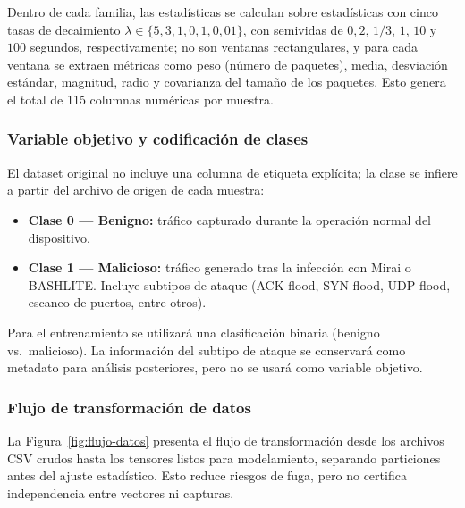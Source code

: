 \documentclass[11pt,a4paper]{article}
\begin{document}
Dentro de cada familia, las estadísticas se calculan sobre estadísticas con cinco tasas de decaimiento $\lambda \in \{5,3,1,0{,}1,0{,}01\}$, con semividas de $0{,}2$, $1/3$, $1$, $10$ y $100$ segundos, respectivamente; no son ventanas rectangulares, y para cada ventana se extraen métricas como peso (número de paquetes), media, desviación estándar, magnitud, radio y covarianza del tamaño de los paquetes. Esto genera el total de 115 columnas numéricas por muestra.

\subsubsection{Variable objetivo y codificación de clases}
El dataset original no incluye una columna de etiqueta explícita; la clase se infiere a partir del archivo de origen de cada muestra:
\begin{itemize}
  \item \textbf{Clase 0 --- Benigno:} tráfico capturado durante la operación normal del dispositivo.
  \item \textbf{Clase 1 --- Malicioso:} tráfico generado tras la infección con Mirai o BASHLITE. Incluye subtipos de ataque (ACK flood, SYN flood, UDP flood, escaneo de puertos, entre otros).
\end{itemize}

Para el entrenamiento se utilizará una clasificación binaria (benigno vs.\ malicioso). La información del subtipo de ataque se conservará como metadato para análisis posteriores, pero no se usará como variable objetivo.

\subsubsection{Flujo de transformación de datos}
La Figura~\ref{fig:flujo-datos} presenta el flujo de transformación desde los archivos CSV crudos hasta los tensores listos para modelamiento, separando particiones antes del ajuste estadístico. Esto reduce riesgos de fuga, pero no certifica independencia entre vectores ni capturas.
\end{document}
